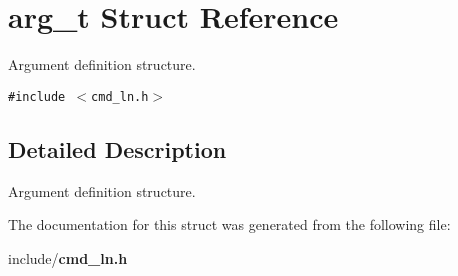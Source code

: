 \section{arg\_\-t Struct Reference}
\label{structarg__t}
Argument definition structure.  


{\tt \#include $<$cmd\_\-ln.h$>$}



\subsection{Detailed Description}
Argument definition structure. 

The documentation for this struct was generated from the following file:\begin{CompactItemize}
\item 
include/{\bf cmd\_\-ln.h}\end{CompactItemize}
